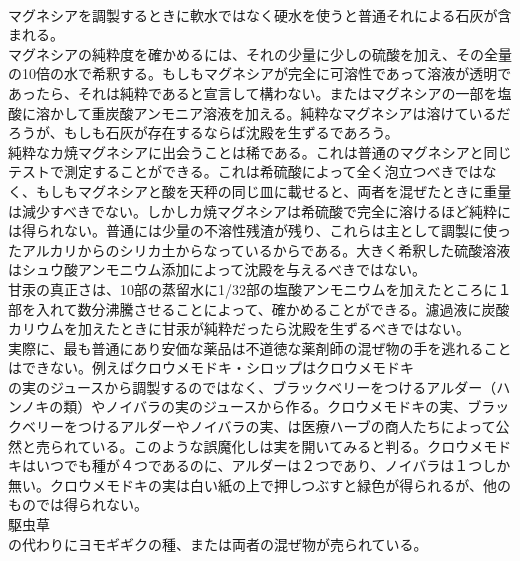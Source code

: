 \documentclass[8pt]{extreport}
\begin{document}
\begin{CJK}{UTF8}{min}
\\	マグネシアを調製するときに軟水ではなく硬水を使うと普通それによる石灰が含まれる。
\\	マグネシアの純粋度を確かめるには、それの少量に少しの硫酸を加え、その全量の10倍の水で希釈する。もしもマグネシアが完全に可溶性であって溶液が透明であったら、それは純粋であると宣言して構わない。またはマグネシアの一部を塩酸に溶かして重炭酸アンモニア溶液を加える。純粋なマグネシアは溶けているだろうが、もしも石灰が存在するならば沈殿を生ずるであろう。
\\	純粋なカ焼マグネシアに出会うことは稀である。これは普通のマグネシアと同じテストで測定することができる。これは希硫酸によって全く泡立つべきではなく、もしもマグネシアと酸を天秤の同じ皿に載せると、両者を混ぜたときに重量は減少すべきでない。しかしカ焼マグネシアは希硫酸で完全に溶けるほど純粋には得られない。普通には少量の不溶性残渣が残り、これらは主として調製に使ったアルカリからのシリカ土からなっているからである。大きく希釈した硫酸溶液はシュウ酸アンモニウム添加によって沈殿を与えるべきではない。
\\	甘汞の真正さは、10部の蒸留水に1/32部の塩酸アンモニウムを加えたところに１部を入れて数分沸騰させることによって、確かめることができる。濾過液に炭酸カリウムを加えたときに甘汞が純粋だったら沈殿を生ずるべきではない。
\\	実際に、最も普通にあり安価な薬品は不道徳な薬剤師の混ぜ物の手を逃れることはできない。例えばクロウメモドキ・シロップはクロウメモドキ
\\	の実のジュースから調製するのではなく、ブラックベリーをつけるアルダー（ハンノキの類）やノイバラの実のジュースから作る。クロウメモドキの実、ブラックベリーをつけるアルダーやノイバラの実、は医療ハーブの商人たちによって公然と売られている。このような誤魔化しは実を開いてみると判る。クロウメモドキはいつでも種が４つであるのに、アルダーは２つであり、ノイバラは１つしか無い。クロウメモドキの実は白い紙の上で押しつぶすと緑色が得られるが、他のものでは得られない。
\\	駆虫草
\\	の代わりにヨモギギクの種、または両者の混ぜ物が売られている。

\end{CJK}
\end{document}
